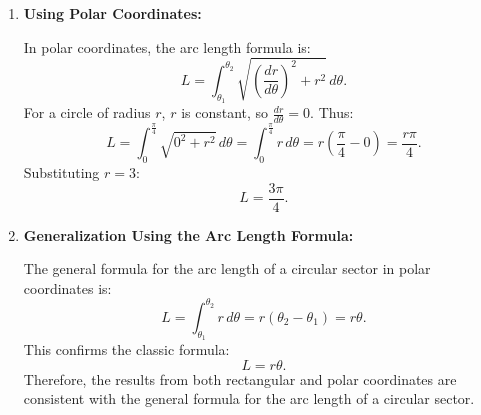 \begin{example}
\begin{solution}
\begin{enumerate}
    \item \textbf{Using Polar Coordinates:}
    
    In polar coordinates, the arc length formula is:
    \[
    L = \int_{\theta_1}^{\theta_2} \sqrt{ \left( \frac{dr}{d\theta} \right)^2 + r^2 } \, d\theta.
    \]
    For a circle of radius \( r \), \( r \) is constant, so \( \frac{dr}{d\theta} = 0 \). Thus:
    \[
    L = \int_{0}^{\frac{\pi}{4}} \sqrt{ 0^2 + r^2 } \, d\theta = \int_{0}^{\frac{\pi}{4}} r \, d\theta = r \left( \frac{\pi}{4} - 0 \right) = \frac{r \pi}{4}.
    \]
    Substituting \( r = 3 \):
    \[
    L = \frac{3 \pi}{4}.
    \]

    \item \textbf{Generalization Using the Arc Length Formula:}
    
    The general formula for the arc length of a circular sector in polar coordinates is:
    \[
    L = \int_{\theta_1}^{\theta_2} r \, d\theta = r (\theta_2 - \theta_1) = r \theta.
    \]
    This confirms the classic formula:
    \[
    L = r \theta.
    \]
    Therefore, the results from both rectangular and polar coordinates are consistent with the general formula for the arc length of a circular sector.
\end{enumerate}
\end{solution}
\end{example}
\exampleline

